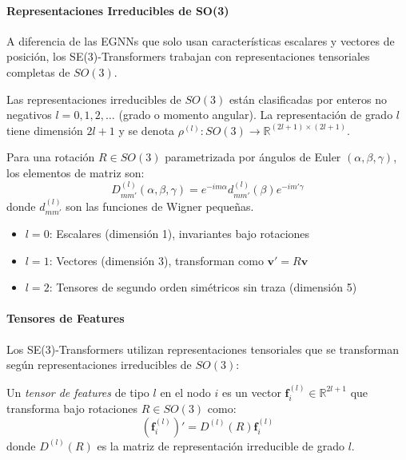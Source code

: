 \paragraph{Representaciones Irreducibles de SO(3)}

A diferencia de las EGNNs que solo usan características escalares y vectores de posición, los SE(3)-Transformers trabajan con representaciones tensoriales completas de $SO(3)$.

\begin{definition}\label{def:irreps_so3}
Las representaciones irreducibles de $SO(3)$ están clasificadas por enteros no negativos $l = 0, 1, 2, \ldots$ (grado o momento angular). La representación de grado $l$ tiene dimensión $2l + 1$ y se denota $\rho^{(l)}: SO(3) \to \mathbb{R}^{(2l+1) \times (2l+1)}$.

Para una rotación $R \in SO(3)$ parametrizada por ángulos de Euler $(\alpha, \beta, \gamma)$, los elementos de matriz son:
\begin{equation}
D_{mm'}^{(l)}(\alpha, \beta, \gamma) = e^{-im\alpha} d_{mm'}^{(l)}(\beta) e^{-im'\gamma}
\end{equation}
donde $d_{mm'}^{(l)}$ son las funciones de Wigner pequeñas.
\end{definition}

\begin{example}
\leavevmode
\begin{itemize}
    \item $l = 0$: Escalares (dimensión 1), invariantes bajo rotaciones
    \item $l = 1$: Vectores (dimensión 3), transforman como $\mathbf{v}' = R\mathbf{v}$
    \item $l = 2$: Tensores de segundo orden simétricos sin traza (dimensión 5)
\end{itemize}
\end{example}

\paragraph{Tensores de Features}

Los SE(3)-Transformers utilizan representaciones tensoriales que se transforman según representaciones irreducibles de $SO(3)$:

\begin{definition}\label{def:feature_tensor_se3}
Un \textit{tensor de features} de tipo $l$ en el nodo $i$ es un vector $\mathbf{f}_i^{(l)} \in \mathbb{R}^{2l+1}$ que transforma bajo rotaciones $R \in SO(3)$ como:
\begin{equation}
(\mathbf{f}_i^{(l)})' = D^{(l)}(R) \mathbf{f}_i^{(l)}
\end{equation}
donde $D^{(l)}(R)$ es la matriz de representación irreducible de grado $l$.
\end{definition}

